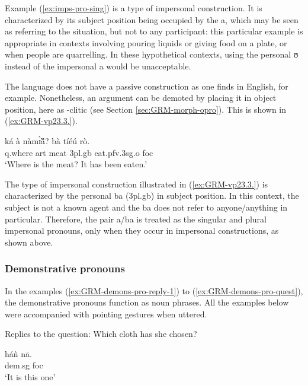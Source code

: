 \begin{exe}
\begin{exe}
\begin{exe}
\begin{exe}
\begin{exe}
\begin{exe}
\begin{exe}
\begin{exe}
\begin{exe}
Example (\ref{ex:imps-pro-sing}) is a type of impersonal construction.  It is 
characterized by its  subject position being  occupied by the  {\sls a}, which may be seen 
as 
referring to the situation,  but not to any participant: this particular example is appropriate in 
contexts involving pouring  liquids or giving food on a plate, or when people are quarrelling. In 
these hypothetical contexts, using the personal  {\sls ʊ} instead of  the  impersonal 
 {\sls a} would be unacceptable.  

The language does not have a passive construction as one finds in English, for example. Nonetheless, an argument  can be demoted  by placing it in object position, here as -clitic  (see Section \ref{sec:GRM-morph-opro}). This is shown in (\ref{ex:GRM-vp23.3.}).


\ea\label{ex:GRM-vp23.3.}
\gll ká à nàmɪ̃̀ã́?  bà tíéú rò.\\
   {\sc q}.where {\sc art} meat {\sc 3pl.g}b  eat.{\sc pfv}.{\sc 3sg.o} 
{\sc foc}\\
\glt  `Where is the meat? It has been eaten.'
\z


The type of impersonal construction illustrated in  (\ref{ex:GRM-vp23.3.})  is characterized by the personal  {\sls ba} ({\sc 3pl.g}b)  in subject position. In this context,  the subject is not a known agent and the  {\sls ba} does not refer to anyone/anything in particular. Therefore,  the pair {\sls a}/{\sls ba} is treated  as the singular and plural impersonal pronouns, only when they occur in impersonal constructions, as shown above.



\subsubsection{Demonstrative pronouns}
\label{sec:GRM-demons-pro}


In the examples (\ref{ex:GRM-demons-pro-reply-1}) to (\ref{ex:GRM-demons-pro-quest}),  the demonstrative pronouns  function as noun phrases. All the examples below were accompanied with pointing gestures when uttered.

\ea\label{ex:GRM-demons-pro-reply-1}{\rm Replies to the question: Which cloth
has she chosen?}
 
 
  \ea\label{ex:GRM-demons-pro-reply-1sg} 
 \gll háǹ nā.\\
   {\sc dem.sg} {\sc foc}\\
 \glt `It is this one' 
   

\end{exe}
\end{exe}
\end{exe}
\end{exe}
\end{exe}
\end{exe}
\end{exe}
\end{exe}
\end{exe}
